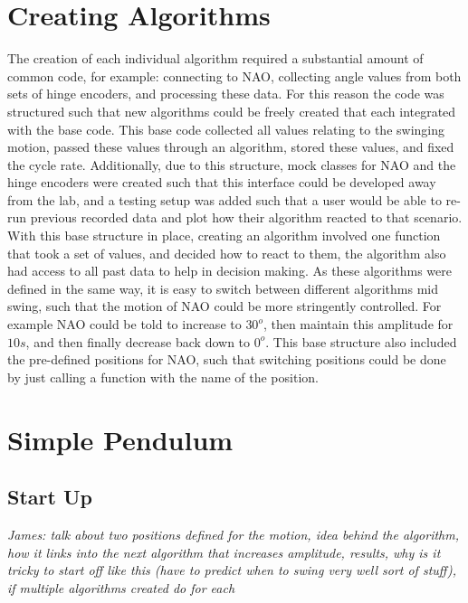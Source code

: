 \documentclass[11pt]{article}
\newcommand*\ruleline[1]{\par\noindent\raisebox{.8ex}{\makebox[\linewidth]{\hrulefill\hspace{1ex}\raisebox{-.8ex}{#1}\hspace{1ex}\hrulefill}}}
\begin{document}
\section{Creating Algorithms}

\ruleline{George Sheppard}

The creation of each individual algorithm required a substantial amount of common code, for example: connecting to NAO, collecting angle values from both sets of hinge encoders, and processing these data. For this reason the code was structured such that new algorithms could be freely created that each integrated with the base code. This base code collected all values relating to the swinging motion, passed these values through an algorithm, stored these values, and fixed the cycle rate. Additionally, due to this structure, mock classes for NAO and the hinge encoders were created such that this interface could be developed away from the lab, and a testing setup was added such that a user would be able to re-run previous recorded data and plot how their algorithm reacted to that scenario.\\

With this base structure in place, creating an algorithm involved one function that took a set of values, and decided how to react to them, the algorithm also had access to all past data to help in decision making. As these algorithms were defined in the same way, it is easy to switch between different algorithms mid swing, such that the motion of NAO could be more stringently controlled. For example NAO could be told to increase to $30^o$, then maintain this amplitude for $10s$, and then finally decrease back down to $0^o$.  This base structure also included the pre-defined positions for NAO, such that switching positions could be done by just calling a function with the name of the position.

\section{Simple Pendulum}
\subsection{Start Up}

\ruleline{James Doering}

\textit{James: talk about two positions defined for the motion, idea behind the algorithm, how it links into the next algorithm that increases amplitude, results, why is it tricky to start off like this (have to predict when to swing very well sort of stuff), if multiple algorithms created do for each} \\
\end{document}
